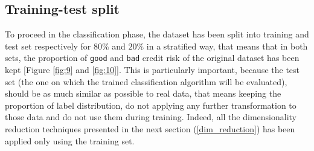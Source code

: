 \documentclass[letterpaper]{article}
\begin{document}
	\subsection{Training-test split}
	To proceed in the classification phase, the dataset has been split into training and test set respectively for $80\%$ and $20\%$ in a stratified way, that means that in both sets, the proportion of \texttt{good} and \texttt{bad} credit risk of the original dataset has been kept [Figure \ref{fig:9} and \ref{fig:10}]. This is particularly important, because the test set (the one on which the trained classification algorithm will be evaluated), should be as much similar as possible to real data, that means keeping the proportion of label distribution, do not applying any further transformation to those data and do not use them during training. Indeed, all the dimensionality reduction techniques presented in the next section (\ref{dim_reduction}) has been applied only using the training set.
	
\end{document}
